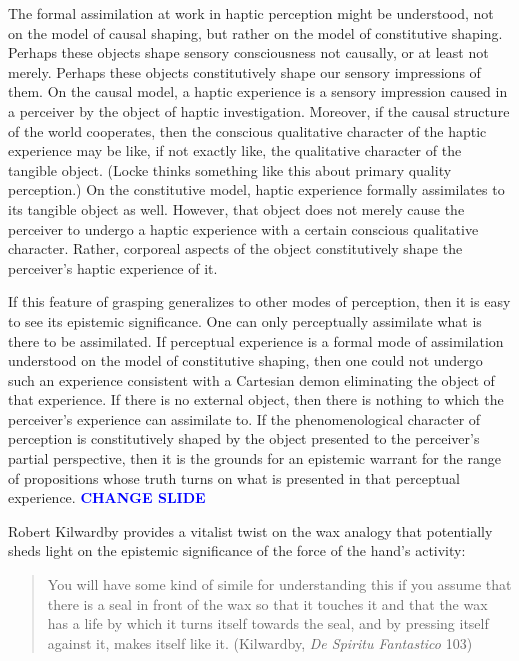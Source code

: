 \documentclass[12pt]{article}
\newcommand{\change}{\textcolor{blue}{\textbf{CHANGE SLIDE}}}
\begin{document}
The formal assimilation at work in haptic perception might be understood, not on the model of causal shaping, but rather on the model of constitutive shaping. Perhaps these objects shape sensory consciousness not causally, or at least not merely. Perhaps these objects constitutively shape our sensory impressions of them. On the causal model, a haptic experience is a sensory impression caused in a perceiver by the object of haptic investigation. Moreover, if the causal structure of the world cooperates, then the conscious qualitative character of the haptic experience may be like, if not exactly like, the qualitative character of the tangible object. (Locke thinks something like this about primary quality perception.) On the constitutive model, haptic experience formally assimilates to its tangible object as well. However, that object does not merely cause the perceiver to undergo a haptic experience with a certain conscious qualitative character. Rather, corporeal aspects of the object constitutively shape the perceiver's haptic experience of it. 

If this feature of grasping  generalizes to other modes of perception, then it is easy to see its epistemic significance. One can only perceptually assimilate what is there to be assimilated. If perceptual experience is a formal mode of assimilation understood on the model of constitutive shaping, then one could not undergo such an experience consistent with a Cartesian demon eliminating the object of that experience. If there is no external object, then there is nothing to which the perceiver's experience can assimilate to. If the phenomenological character of perception is constitutively shaped by the object presented to the perceiver's partial perspective, then it is the grounds for an epistemic warrant for the range of propositions whose truth turns on what is presented in that perceptual experience. \change

Robert Kilwardby provides a vitalist twist on the wax analogy that potentially sheds light on the epistemic significance of the force of the hand's activity:
\begin{quote}
	You will have some kind of simile for understanding this if you assume that there is a seal in front of the wax so that it touches it and that the wax has a life by which it turns itself towards the seal, and by pressing itself against it, makes itself like it. (Kilwardby, \emph{De Spiritu Fantastico} 103)
\end{quote}
\end{document}
